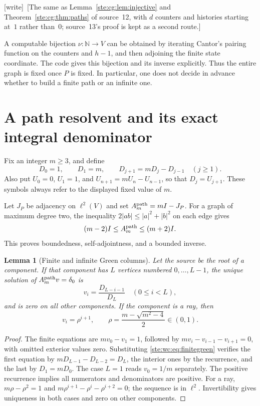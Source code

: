 \documentclass[11pt,letterpaper]{article}
\newtheorem{lemma}[theorem]{Lemma}
\theoremstyle{definition}
\theoremstyle{remark}
\newcommand{\N}{\mathbb N}
\newcommand{\wtag}{\textup{[write]}}
\begin{document}
\wtag\ [The same as Lemma~\ref{ste:cg:lem:injective} and Theorem~\ref{ste:cg:thm:paths} of source~12, with $d$ counters and histories starting at~$1$ rather than~$0$; source~13's proof is kept as a second route.]


A computable bijection $\nu:\N\to V$ can be obtained by iterating Cantor's
pairing function on the counters and $h-1$, and then adjoining the finite
state coordinate. The code gives this bijection and its inverse explicitly.
Thus the entire graph is fixed once $P$ is fixed. In particular, one does
not decide in advance whether to build a finite path or an infinite one.

\section{A path resolvent and its exact integral denominator}
\label{ste:wc:sec:resolvent}

Fix an integer $m\geq3$, and define
\begin{equation}\label{ste:wc:eq:continuant}
 D_0=1,\qquad D_1=m,\qquad D_{j+1}=mD_j-D_{j-1}\quad(j\geq1).
\end{equation}
Also put $U_0=0$, $U_1=1$, and $U_{n+1}=mU_n-U_{n-1}$, so that
$D_j=U_{j+1}$. These symbols always refer to the displayed fixed value of $m$.

Let $J_P$ be adjacency on $\ell^2(V)$ and set $A^{\rm path}_m=mI-J_P$.
For a graph of maximum degree two, the inequality
$2|ab|\leq |a|^2+|b|^2$ on each edge gives
\begin{equation}\label{ste:wc:eq:pathbound}
 (m-2)I\leq A^{\rm path}_m\leq(m+2)I.
\end{equation}
This proves boundedness, self-adjointness, and a bounded inverse.

\begin{lemma}[Finite and infinite Green columns]\label{ste:wc:lem:green}
Let the source be the root of a component. If that component has $L$ vertices
numbered $0,\ldots,L-1$, the unique solution of
$A^{\rm path}_m v=\delta_0$ is
\begin{equation}\label{ste:wc:eq:finitegreen}
 v_i=\frac{D_{L-i-1}}{D_L}\quad(0\leq i<L),
\end{equation}
and is zero on all other components. If the component is a ray, then
\begin{equation}\label{ste:wc:eq:raygreen}
 v_i=\rho^{i+1},\qquad
 \rho=\frac{m-\sqrt{m^2-4}}2\in(0,1).
\end{equation}
\end{lemma}
\begin{proof}
The finite equations are $mv_0-v_1=1$, followed by
$mv_i-v_{i-1}-v_{i+1}=0$, with omitted exterior values zero. Substituting
\eqref{ste:wc:eq:finitegreen} verifies the first equation by
$mD_{L-1}-D_{L-2}=D_L$, the interior ones by the recurrence, and the last
by $D_1=mD_0$. The case $L=1$ reads $v_0=1/m$ separately.
The positive recurrence implies all numerators and denominators are
positive. For a ray, $m\rho-\rho^2=1$ and
$m\rho^{i+1}-\rho^i-\rho^{i+2}=0$; the sequence is in $\ell^2$.
Invertibility gives uniqueness in both cases and zero on other components.
\end{proof}
\end{document}
